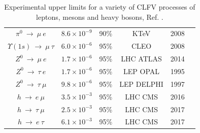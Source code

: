 \begin{center}
\begin{table}[!h]
\begin{tabular}{c c c c c c}
$\pi^0 \ \rightarrow \ \mu \ e$ & $8.6 \times 10^{-9}$ & 90\% & KTeV & 2008 & \cite{KTeV:2007cvy}\\
$\Upsilon (1s) \ \rightarrow \ \mu \ \tau $ & $6.0 \times 10^{-6}$ & 95\% & CLEO & 2008 & \cite{Love_2008}\\
\hline
$Z^0 \ \rightarrow \ \mu \ e$ & $1.7 \times 10^{-6}$ & 95\% &  LHC ATLAS & 2014 & \cite{Aad_2014} \\
$Z^0 \ \rightarrow \ \tau \ e$ & $1.7 \times 10^{-6}$ & 95\% &  LEP OPAL & 1995 & \cite{akers}\\
$Z^0 \ \rightarrow \ \tau \ \mu$ & $9.8 \times 10^{-6}$ & 95\% &  LEP DELPHI & 1997 & \cite{abreu}\\
$h \ \rightarrow \ e \ \mu$ & $3.5 \times 10^{-3}$ & 95\% & LHC CMS & 2016 & \cite{PhysRevD.104.032013}\\
$h \ \rightarrow \ \tau  \ \mu$ & $2.5 \times 10^{-3}$ & 95\% & LHC CMS & 2017 & \cite{cms17}\\
$h \ \rightarrow \ e \ \tau$ & $6.1 \times 10^{-3}$ & 95\% & LHC CMS & 2017 & \cite{cms17}\\
\hline
\end{tabular}
\caption{Experimental upper limits for a variety of CLFV processes of leptons, mesons and heavy bosons, Ref. \cite{clfv_signorelli}.}
\end{table}\label{tab:upperlimits}
\end{center}


